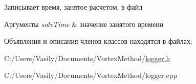 Записывает время, занятое расчетом, в файл 
\begin{DoxyParams}{Аргументы}
{\em solv\+Time} & значение занятого времени \\
\hline
\end{DoxyParams}


Объявления и описания членов классов находятся в файлах\+:\begin{DoxyCompactItemize}
\item 
C\+:/\+Users/\+Vasily/\+Documents/\+Vortex\+Method/\mbox{\hyperlink{logger_8h}{logger.\+h}}\item 
C\+:/\+Users/\+Vasily/\+Documents/\+Vortex\+Method/logger.\+cpp\end{DoxyCompactItemize}
